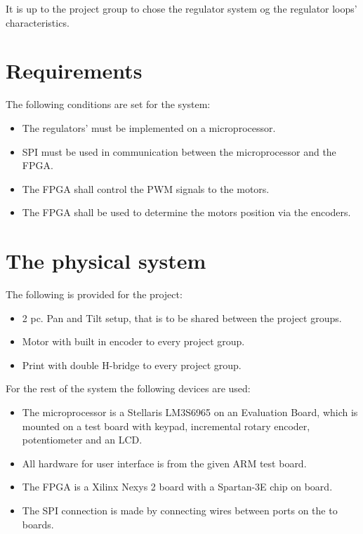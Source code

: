 It is up to the project group to chose the regulator system og the regulator loops' characteristics.

\section{Requirements}

The following conditions are set for the system:
\begin{itemize}
\item The regulators' must be implemented on a microprocessor.
\item SPI must be used in communication between the microprocessor and the FPGA.
\item The FPGA shall control the PWM signals to the motors.
\item The FPGA shall be used to determine the motors position via the encoders.
\end{itemize}

\section{The physical system}

The following is provided for the project:

\begin{itemize}
\item 2 pc. Pan and Tilt setup, that is to be shared between the project groups.
\item Motor with built in encoder to every project group.
\item Print with double H-bridge to every project group.
\end{itemize}

For the rest of the system the following devices are used:

\begin{itemize}
\item The microprocessor is a Stellaris LM3S6965 on an Evaluation Board, which is mounted on a test board with keypad, incremental rotary encoder, potentiometer and an LCD.
\item All hardware for user interface is from the given ARM test board.
\item The FPGA is a Xilinx Nexys 2 board with a Spartan-3E chip on board.
\item The SPI connection is made by connecting wires between ports on the to boards.
\end{itemize}

